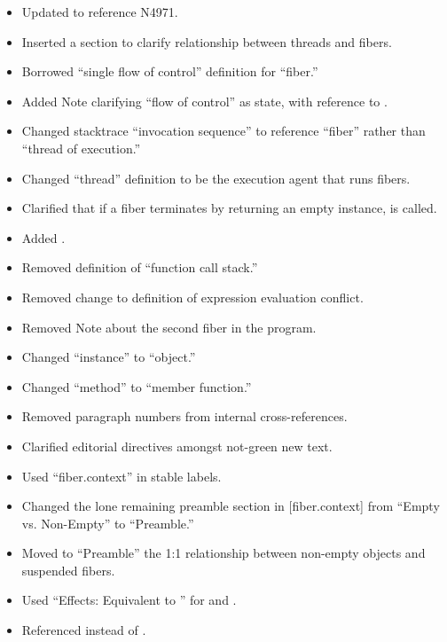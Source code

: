 \begin{itemize}
    \item Updated to reference N4971.
    \item Inserted a section to clarify relationship between threads and fibers.
    \item Borrowed ``single flow of control'' definition for ``fiber.''
    \item Added Note clarifying ``flow of control'' as state, with reference
    to .
    \item Changed stacktrace ``invocation sequence'' to reference ``fiber'' rather
    than ``thread of execution.''
    \item Changed ``thread'' definition to be the execution agent that runs fibers.
    \item Clarified that if a fiber terminates by returning an empty \fiber
          instance,  is called.
    \item Added .
    \item Removed definition of ``function call stack.''
    \item Removed change to definition of expression evaluation conflict.
    \item Removed Note about the second fiber in the program.
    \item Changed ``\fiber instance'' to ``\fiber object.''
    \item Changed ``method'' to ``member function.''
    \item Removed paragraph numbers from internal cross-references.
    \item Clarified editorial directives amongst not-green new text.
    \item Used ``fiber.context'' in stable labels.
    \item Changed the lone remaining preamble section in [fiber.context] from
    ``Empty vs. Non-Empty'' to ``Preamble.''
    \item Moved to ``Preamble'' the 1:1 relationship between non-empty \fiber
    objects and suspended fibers.
    \item Used ``Effects: Equivalent to '' for
     and .
    \item Referenced \justmain instead of \main.
\end{itemize}


